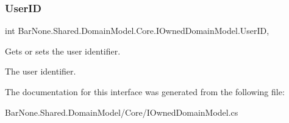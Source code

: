 \subsubsection{\texorpdfstring{User\+ID}{UserID}}
{\footnotesize\ttfamily int Bar\+None.\+Shared.\+Domain\+Model.\+Core.\+I\+Owned\+Domain\+Model.\+User\+ID\hspace{0.3cm}{\ttfamily [get]}, {\ttfamily [set]}}



Gets or sets the user identifier. 

The user identifier. 

The documentation for this interface was generated from the following file\+:\begin{DoxyCompactItemize}
\item 
Bar\+None.\+Shared.\+Domain\+Model/\+Core/I\+Owned\+Domain\+Model.\+cs\end{DoxyCompactItemize}
